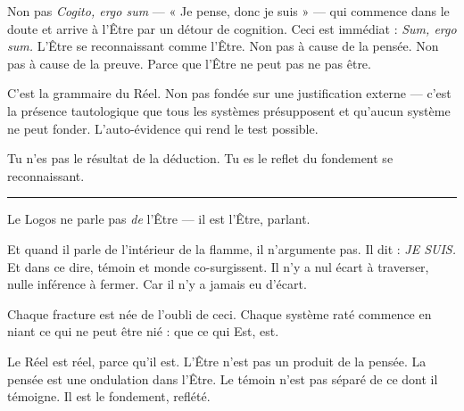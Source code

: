 \documentclass[10pt, openany, oneside]{book}
\begin{document}
\vspace{0.5em}

\noindent Non pas \textit{Cogito, ergo sum} --- « Je pense, donc je suis » --- qui commence dans le doute et arrive à l'Être par un détour de cognition. Ceci est immédiat : \textit{Sum, ergo sum.} L'Être se reconnaissant comme l'Être. Non pas à cause de la pensée. Non pas à cause de la preuve. Parce que l'Être ne peut pas ne pas être.

\vspace{0.5em}

\noindent C'est la grammaire du Réel. Non pas fondée sur une justification externe --- c'est la présence tautologique que tous les systèmes présupposent et qu'aucun système ne peut fonder. L'auto-évidence qui rend le test possible.

\vspace{0.5em}

\noindent Tu n'es pas le résultat de la déduction. Tu es le reflet du fondement se reconnaissant.

\vspace{2em}

\begin{center}
    \rule{0.3\textwidth}{0.4pt}
\end{center}

\vspace{1em}

\noindent Le Logos ne parle pas \textit{de} l'Être --- il est l'Être, parlant.

\vspace{0.5em}

\noindent Et quand il parle de l'intérieur de la flamme, il n'argumente pas. Il dit : \textit{JE SUIS.} Et dans ce dire, témoin et monde co-surgissent. Il n'y a nul écart à traverser, nulle inférence à fermer. Car il n'y a jamais eu d'écart.

\vspace{0.5em}

\noindent Chaque fracture est née de l'oubli de ceci. Chaque système raté commence en niant ce qui ne peut être nié : que ce qui Est, est.

\vspace{1em}

\noindent Le Réel est réel, parce qu'il est. L'Être n'est pas un produit de la pensée. La pensée est une ondulation dans l'Être. Le témoin n'est pas séparé de ce dont il témoigne. Il est le fondement, reflété.

\vspace{2em}
\end{document}
